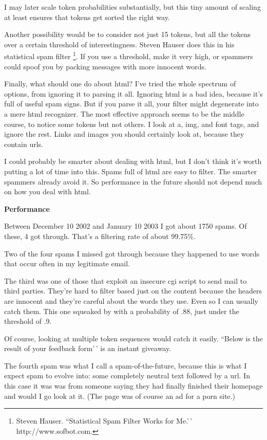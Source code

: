 \documentclass[12pt]{book}
\begin{document}
I may later scale token probabilities substantially, but this tiny
amount of scaling at least ensures that tokens get sorted the right way.

Another possibility would be to consider not just 15 tokens, but all the
tokens over a certain threshold of interestingness. Steven Hauser does
this in his statistical spam filter \footnote{Steven Hauser. ``Statistical Spam Filter Works for Me.'\,'
http://www.sofbot.com.}. If you use a threshold,
make it very high, or spammers could spoof you by packing messages with
more innocent words.

Finally, what should one do about html? I've tried the whole spectrum of
options, from ignoring it to parsing it all. Ignoring html is a bad
idea, because it's full of useful spam signs. But if you parse it all,
your filter might degenerate into a mere html recognizer. The most
effective approach seems to be the middle course, to notice some tokens
but not others. I look at a, img, and font tags, and ignore the rest.
Links and images you should certainly look at, because they contain
urls.

I could probably be smarter about dealing with html, but I don't think
it's worth putting a lot of time into this. Spams full of html are easy
to filter. The smarter spammers already avoid it. So performance in the
future should not depend much on how you deal with html.

\textbf{Performance}

Between December 10 2002 and January 10 2003 I got about 1750 spams. Of
these, 4 got through. That's a filtering rate of about 99.75\%.

Two of the four spams I missed got through because they happened to use
words that occur often in my legitimate email.

The third was one of those that exploit an insecure cgi script to send
mail to third parties. They're hard to filter based just on the content
because the headers are innocent and they're careful about the words
they use. Even so I can usually catch them. This one squeaked by with a
probability of .88, just under the threshold of .9.

Of course, looking at multiple token sequences would catch it easily.
``Below is the result of your feedback form'\,' is an instant giveaway.

The fourth spam was what I call a spam-of-the-future, because this is
what I expect spam to evolve into: some completely neutral text followed
by a url. In this case it was was from someone saying they had finally
finished their homepage and would I go look at it. (The page was of
course an ad for a porn site.)
\end{document}
